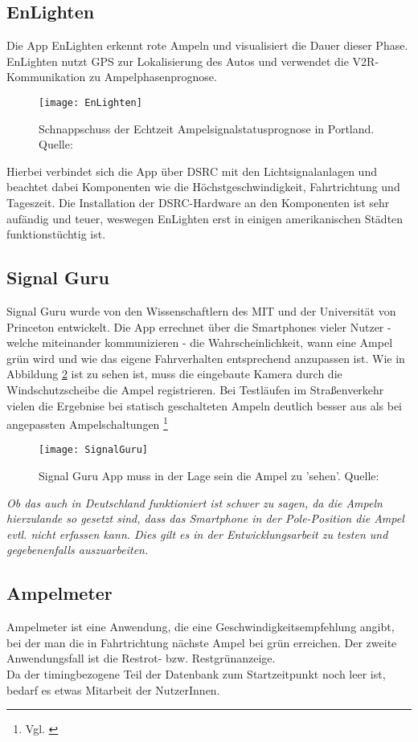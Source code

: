 \subsection{EnLighten}
Die \gls{App} EnLighten erkennt rote Ampeln und visualisiert die Dauer dieser Phase.  
EnLighten nutzt \gls{GPS} zur Lokalisierung des Autos und verwendet die \gls{V2R}-Kommunikation zu Ampelphasenprognose.
\begin{figure}[H]
    \centering
    \texttt{[image: EnLighten]}
    \label{fig:Ampelsignalstatus}
    \caption[Echtzeit Ampelsignalstatus]{Schnappschuss der Echtzeit Ampelsignalstatusprognose in Portland. Quelle: \cite{EnLighten}}
\end{figure}
Hierbei verbindet sich die App über \gls{DSRC} mit den Lichtsignalanlagen und beachtet dabei Komponenten wie die Höchstgeschwindigkeit, Fahrtrichtung und Tageszeit.
Die Installation der \gls{DSRC}-Hardware an den Komponenten ist sehr aufändig und teuer, weswegen EnLighten erst in einigen amerikanischen Städten funktionstüchtig ist.
\subsection{Signal Guru}
Signal Guru wurde von den Wissenschaftlern des \gls{MIT} und der Universität von Princeton entwickelt. Die App errechnet über die Smartphones vieler Nutzer - welche miteinander kommunizieren -  die Wahrscheinlichkeit, wann eine Ampel grün wird und wie das eigene Fahrverhalten entsprechend anzupassen ist. Wie in Abbildung \ref{fig:AppSignalGuru} ist zu sehen ist, muss die eingebaute Kamera durch die Windschutzscheibe die Ampel registrieren. Bei Testläufen im Straßenverkehr vielen die Ergebnise bei statisch geschalteten Ampeln deutlich besser aus als bei angepassten Ampelschaltungen \footnote{Vgl. \cite{SignalGuru}} 
\begin{figure}[H]
    \centering
    \texttt{[image: SignalGuru]}
    \caption[Signal Guru]{Signal Guru App muss in der Lage sein die Ampel zu 'sehen'.  Quelle: \cite{SignalGuruPaper}}
    \label{fig:AppSignalGuru}
\end{figure}
\textit{Ob das auch in Deutschland funktioniert ist schwer zu sagen, da die Ampeln hierzulande so gesetzt sind, dass das Smartphone in der Pole-Position die Ampel evtl. nicht erfassen kann. Dies gilt es in der Entwicklungsarbeit zu testen und gegebenenfalls auszuarbeiten.}
\subsection{Ampelmeter}
Ampelmeter ist eine Anwendung, die eine Geschwindigkeitsempfehlung angibt, bei der man die in Fahrtrichtung nächste Ampel bei grün erreichen. Der zweite Anwendungsfall ist die Restrot- bzw. Restgrünanzeige.\\
Da der timingbezogene Teil der Datenbank zum Startzeitpunkt noch leer ist, bedarf es etwas Mitarbeit der NutzerInnen.
